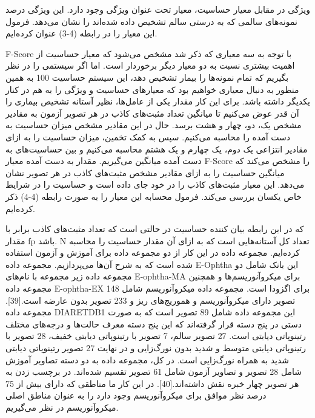 ویژگی 
در مقابل معیار حساسیت، معیار تحت عنوان ویژگی وجود دارد. این ویژگی درصد نمونه‌های سالمی که به درستی سالم تشخیص داده شده‌اند را نشان می‌دهد. فرمول این معیار را در رابطه (4-3) عنوان کرده‌ایم.

F-Score
با توجه به سه معیاری که ذکر شد مشخص می‌شود که معیار حساسیت از اهمیت بیشتری نسبت به دو معیار دیگر برخوردار است. اما اگر سیستمی را در نظر بگیریم که تمام نمونه‌ها را بیمار تشخیص دهد، این سیستم حساسیت 100%
به همین منظور به دنبال معیاری خواهیم بود که معیارهای حساسیت و ویژگی را به هم در کنار یکدیگر داشته باشد. برای این کار مقدار یکی از عامل‌ها، نظیر آستانه تشخیص بیماری را آن قدر عوض می‌کنیم تا میانگین تعداد مثبت‌های کاذب در هر تصویر آزمون به مقادیر مشخص یک، دو، چهار و هشت برسد. حال در این مقادیر مشخص میزان حساسیت به دست آمده را محاسبه می‌کنیم. سپس به کمک تخمین، میزان حساسیت را به ازای مقادیر انتزاعی یک دوم، یک چهارم و یک هشتم محاسبه می‌کنیم و بین حساسیت‌های به دست آمده میانگین می‌گیریم. مقدار به دست آمده معیار F-Score را مشخص می‌کند که میانگین حساسیت را به ازای مقادیر مشخص مثبت‌های کاذب در هر تصویر نشان می‌دهد.
این معیار مثبت‌های کاذب را در خود جای داده است و حساسیت را در شرایط خاص یکسان بررسی می‌کند. فرمول محسابه این معیار را به صورت رابطه (4-4) ذکر کرده‌ایم.

که در این رابطه بیان کننده حساسیت در حالتی است که تعداد مثبت‌های کاذب برابر با مقدار fp باشد. N تعداد کل آستانه‌هایی است که به ازای آن مقدار حساسیت را محاسبه کرده‌ایم.
مجموعه داده
در این کار از دو مجموعه داده برای آموزش و آزمون استفاده شده است که به شرح آن‌ها می‌پردازیم.
مجموعه داده E-Ophtha
این بانک شامل دو مجموعه داده زیر مجموعه با نام‌های E-ophtha-MA برای میکروآنوریسم‌ها و همچنین مجموعه داده E-ophtha-EX برای اگزودا است. مجموعه داده میکروآنوریسم شامل 148 تصویر دارای میکروآنوریسم و هموریج‌های ریز و 233 تصویر بدون عارضه است.[39].
مجموعه داده DIARETDB1
این مجموعه داده شامل 89 تصویر است که به صورت دستی در پنج دسته قرار گرفته‌اند که این پنج دسته معرف حالت‌ها و درجه‌های مختلف رتینوپاتی دیابتی است. 27 تصویر سالم، 7 تصویر با رتینوپاتی دیابتی خفیف، 
28 تصویر با رتینوپاتی دیابتی متوسط و شدید بدون نورگ‌زایی و در نهایت 27 تصویر رتینوپاتی دیابتی شدید به همراه نورگ‌‌زایی است. در کل، مجموعه داده به دو دسته تصاویر آموزش شامل 28 تصویر و تصاویر آزمون شامل 61 تصویر تقسیم شده‌اند. در برچسب زدن به هر تصویر چهار خبره نقش داشته‌اند.[40]. در این کار ما مناطقی که دارای بیش از 75 درصد نظر موافق برای میکروآنوریسم وجود دارد را به عنوان مناطق اصلی میکروآنوریسم در نظر می‌گیریم.

